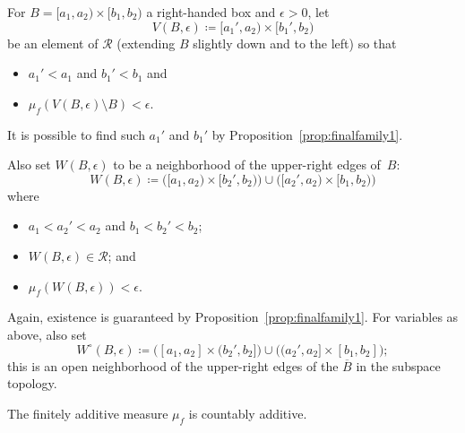 \begin{definition}
  For $B = [a_1,a_2) \times [b_1,b_2)$ a right-handed box and
  $\epsilon > 0$, let
  \[V(B,\epsilon) \coloneqq [a_1',a_2) \times [b_1',b_2)\]
  be an element of $\mathcal{R}$ (extending
    $B$ slightly down and to the left) so that
  \begin{itemize}
  \item $a_1' < a_1$ and $b_1' < b_1$ and
  \item $\mu_f(V(B,\epsilon) \setminus B) < \epsilon$.
  \end{itemize}
  It is possible to find such $a_1'$ and $b_1'$ by
  Proposition~\ref{prop:finalfamily1}.

  Also set $W(B,\epsilon)$ to be a neighborhood of the upper-right
  edges of~$B$:
  \[
    W(B,\epsilon) \coloneqq \bigl([a_1,a_2) \times [b_2',b_2)\bigr) \cup
      \bigl([a_2',a_2) \times [b_1,b_2)\bigr)
  \]
  where
  \begin{itemize}
  \item $a_1 < a_2' < a_2$ and $b_1 < b_2' < b_2$;
  \item $W(B,\epsilon)\in \mathcal{R}$; and
  \item $\mu_f(W(B,\epsilon)) < \epsilon$.
  \end{itemize}
  Again, existence is guaranteed by Proposition~\ref{prop:finalfamily1}.
  For variables as above, also set
  \[
    W^\circ(B,\epsilon) \coloneqq \bigl([a_1,a_2] \times (b_2',b_2]\bigr) \cup
      \bigl((a_2',a_2] \times [b_1,b_2]\bigr);
  \]
  this is an open neighborhood of the upper-right edges of the
  $\overline{B}$ in the subspace topology.
\end{definition}

\begin{proposition}
  The finitely additive measure $\mu_f$ is countably additive.
\end{proposition}

